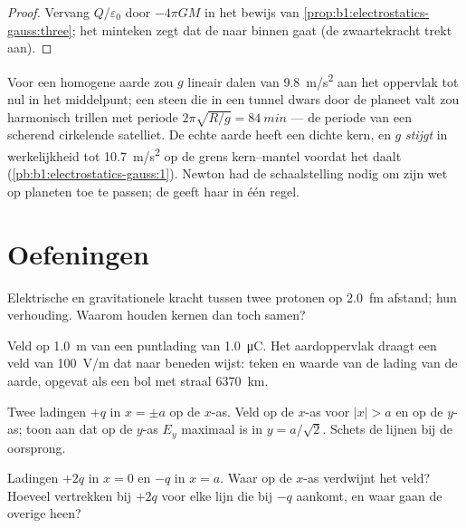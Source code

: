 \begin{proof}
Vervang $Q/\varepsilon_0$ door $-4\pi GM$ in het bewijs van
\cref{prop:b1:electrostatics-gauss:three}; het minteken zegt dat de 
naar binnen gaat (de zwaartekracht trekt aan).
\end{proof}

\begin{example}\label{ex:b1:electrostatics-gauss:earth}
Voor een homogene aarde zou $g$ lineair dalen van \qty{9.8}{m/s^2} aan het
oppervlak tot nul in het middelpunt; een steen die in een tunnel dwars door
de planeet valt zou harmonisch trillen met periode $2\pi\sqrt{R/g} =
\qty{84}{min}$ --- de periode van een scherend cirkelende satelliet. De echte aarde heeft
een dichte kern, en $g$ \emph{stijgt} in werkelijkheid tot \qty{10.7}{m/s^2} op de
grens kern--mantel voordat het daalt (\cref{pb:b1:electrostatics-gauss:1}).
Newton had de schaalstelling nodig om zijn wet op planeten toe te passen; de  geeft haar in één regel.
\end{example}

\section{Oefeningen}

\begin{exercise}[$\star$]\label{exo:b1:electrostatics-gauss:1}
Elektrische en gravitationele kracht tussen twee protonen op
\qty{2.0}{fm} afstand; hun verhouding. Waarom houden kernen dan toch samen?
\end{exercise}

\begin{exercise}[$\star$]\label{exo:b1:electrostatics-gauss:2}
Veld op \qty{1.0}{m} van een puntlading van \qty{1.0}{\micro C}. Het aardoppervlak
draagt een veld van \qty{100}{V/m} dat naar beneden wijst: teken en waarde van
de lading van de aarde, opgevat als een bol met straal \qty{6370}{km}.
\end{exercise}

\begin{exercise}[$\star$]\label{exo:b1:electrostatics-gauss:3}
Twee ladingen $+q$ in $x = \pm a$ op de $x$-as. Veld op de $x$-as
voor $|x| > a$ en op de $y$-as; toon aan dat op de $y$-as $E_y$
maximaal is in $y = a/\sqrt2$. Schets de lijnen bij de oorsprong.
\end{exercise}

\begin{exercise}[$\star$]\label{exo:b1:electrostatics-gauss:4}
Ladingen $+2q$ in $x = 0$ en $-q$ in $x = a$. Waar op de $x$-as verdwijnt
het veld? Hoeveel  vertrekken bij $+2q$ voor elke lijn
die bij $-q$ aankomt, en waar gaan de overige heen?
\end{exercise}

